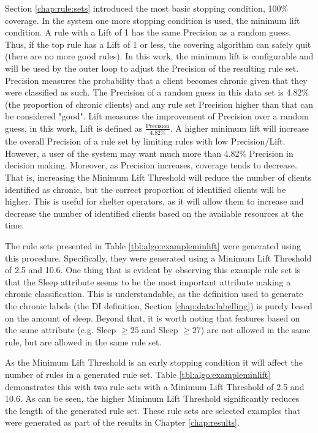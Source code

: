 Section \ref{chap:rule:sets} introduced the most basic stopping condition, 100\% coverage. In the \Abb system one more stopping condition is used, the minimum lift condition. A rule with a Lift of 1 has the same Precision as a random guess. Thus, if the top rule has a Lift of 1 or less, the covering algorithm can safely quit (there are no more good rules). In this work, the minimum lift is configurable and will be used by the outer loop to adjust the Precision of the resulting rule set. Precision measures the probability that a client becomes chronic given that they were classified as such. The Precision of a random guess in this data set is 4.82\% (the proportion of chronic clients) and any rule set Precision higher than that can be considered "good". Lift measures the improvement of Precision over a random guess, in this work, Lift is defined as $\frac{\text{Precision}}{4.82\%}$. A higher minimum lift will increase the overall Precision of a rule set by limiting rules with low Precision/Lift.
However, a user of the system may want much more than 4.82\% Precision in decision making. Moreover, as Precision increases, coverage tends to decrease. That is, increasing the Minimum Lift Threshold will reduce the number of clients identified as chronic, but the correct proportion of identified clients will be higher. This is useful for shelter operators, as it will allow them to increase and decrease the number of identified clients based on the available resources at the time.

The rule sets presented in Table \ref{tbl:algo:exampleminlift} were generated using this procedure. Specifically, they were generated using a Minimum Lift Threshold of 2.5 and 10.6. One thing that is evident by observing this example rule set is that the Sleep attribute seems to be the most important attribute making a chronic classification. This is understandable, as the definition used to generate the chronic labels (the DI definition, Section \ref{chap:data:labelling}) is purely based on the amount of sleep. Beyond that, it is worth noting that features based on the same attribute (e.g. Sleep $\geq 25$ and Sleep $\geq 27$) are not allowed in the same rule, but are allowed in the same rule set.

As the Minimum Lift Threshold is an early stopping condition it will affect the number of rules in a generated rule set. Table \ref{tbl:algo:exampleminlift} demonstrates this with two rule sets with a Minimum Lift Threshold of 2.5 and 10.6. As can be seen, the higher Minimum Lift Threshold significantly reduces the length of the generated rule set. These rule sets are selected examples that were generated as part of the results in Chapter \ref{chap:results}.

